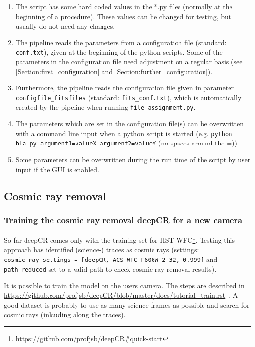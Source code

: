 \documentclass[10pt,a4paper]{article}
\begin{document}
\begin{enumerate}
  \item The script has some hard coded values in the *.py files (normally at the beginning of a procedure). These values can be changed for testing, but usually do not need any changes.
  \item The pipeline reads the parameters from a configuration file (standard: \verb|conf.txt|), given at the beginning of the python scripts. Some of the parameters in the configuration file need adjustment on a regular basis (see \ref{Section:first_configuration} and \ref{Section:further_configuration}).
  \item Furthermore, the pipeline reads the configuration file given in parameter \verb|configfile_fitsfiles| (standard: \verb|fits_conf.txt|), which is automatically created by the pipeline when running \verb|file_assignment.py|.
  \item The parameters which are set in the configuration file(s) can be overwritten with a command line input when a python script is started (e.g. \verb|python bla.py argument1=valueX argument2=valueY| (no spaces around the =)).
  \item Some parameters can be overwritten during the run time of the script by user input if the GUI is enabled.
\end{enumerate}


\subsection{Cosmic ray removal}
\subsubsection{Training the cosmic ray removal deepCR for a new camera}
\label{Section:train_deepCR}
So far deepCR comes only with the training set for HST WFC\footnote{\url{https://github.com/profjsb/deepCR\#quick-start}}. Testing this approach has identified (science-) traces as cosmic rays (settings: \verb|cosmic_ray_settings = [deepCR, ACS-WFC-F606W-2-32, 0.999]| and \verb|path_reduced| set to a valid path to check cosmic ray removal results).

It is possible to train the model on the users camera. The steps are described in 
\url{https://github.com/profjsb/deepCR/blob/master/docs/tutorial_train.rst}~. A good dataset is probably to use as many science frames as possible and search for cosmic rays (inlcuding along the traces).
\end{document}
